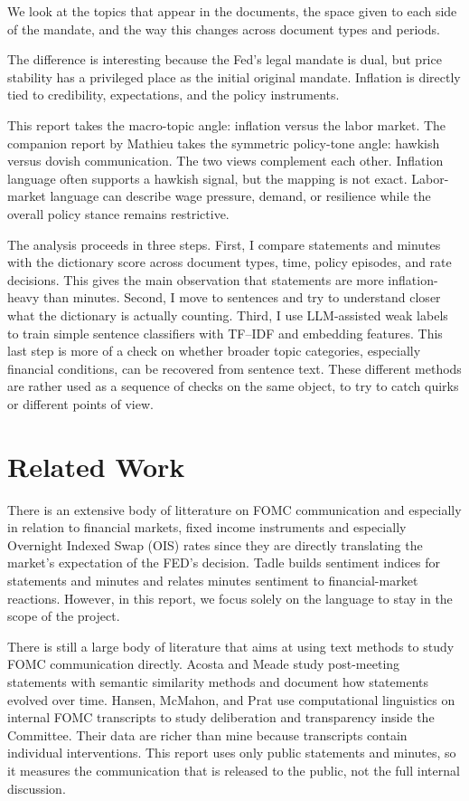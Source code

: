 \documentclass{article}
\newcommand{\fomc}{FOMC}
\newcommand{\tfidf}{TF--IDF}
\begin{document}
We look at the topics that appear in the
documents, the space given to each side of the mandate, and the way this changes across
document types and periods. 

The difference is interesting because the Fed's legal mandate is
dual, but price stability has a privileged place as the initial original mandate. Inflation is
directly tied to credibility, expectations, and the policy instruments. 

This report takes the macro-topic angle: inflation versus the
labor market. The companion report by Mathieu takes the symmetric policy-tone angle: hawkish versus dovish communication.  The two views complement each other. Inflation language often supports a hawkish signal, but the mapping is not exact. Labor-market language can describe 
wage pressure, demand, or resilience while the overall policy stance remains restrictive.

The analysis proceeds in three steps. First, I compare statements and minutes with the
dictionary score across document types, time, policy episodes, and rate decisions. This
gives the main observation that statements are more inflation-heavy than minutes.
Second, I move to sentences and try to understand closer what the dictionary is actually counting. Third,
I use LLM-assisted weak labels to train simple sentence classifiers with \tfidf{} and
embedding features. This last step is more of a
check on whether broader topic categories, especially financial conditions, can be
recovered from sentence text. These different methods are rather used as a sequence of
checks on the same object, to try to catch quirks or different points of view.

\section*{Related Work}
\label{sec:literature}

There is an extensive body of litterature on FOMC communication and especially in relation to financial markets, fixed income instruments and especially Overnight Indexed Swap (OIS) rates  since they are directly translating the market's expectation of the FED's decision.  Tadle
\citep{tadle2022minutes} builds sentiment indices for statements and minutes and relates minutes sentiment to financial-market reactions. 
However, in this report, we focus solely on the language to stay in the scope of the project.


There is still a large body of literature that aims at using text methods to study \fomc{} communication directly. Acosta and
Meade \citep{acosta2015hanging} study post-meeting statements with semantic similarity
methods and document how statements evolved over time. Hansen, McMahon, and Prat
\citep{hansen2018transparency} use computational linguistics on internal \fomc{}
transcripts to study deliberation and transparency inside the Committee. Their data are
richer than mine because transcripts contain individual interventions. This report uses
only public statements and minutes, so it measures the communication that is released to
the public, not the full internal discussion.
\end{document}
